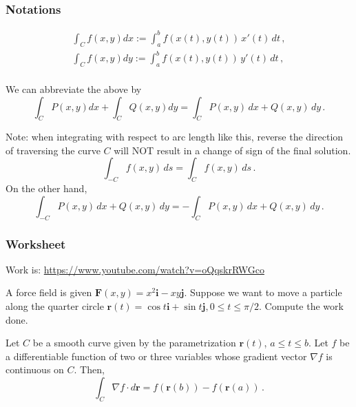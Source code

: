 \documentclass[aspectratio=169]{beamer}
\newcommand{\vect}{\mathbf}
\begin{document}
\begin{frame}
    \frametitle{Notations}
    \begin{align*}
    \int_C f(x,y) dx := \int_a^b f(x(t), y(t) ) \, x'(t) \, dt \,, \\
    \int_C f(x,y) dy := \int_a^b f(x(t), y(t) ) \, y'(t) \, dt \,, \\
    \end{align*}

    We can abbreviate the above by
    \begin{equation*}
    \int_C P(x,y) dx +
    \int_C Q(x,y) dy 
    = \int_C P(x,y) \, dx + Q(x,y) \, dy \,.
    \end{equation*}
\end{frame}

\begin{frame}
Note: when integrating with respect to arc length like this, reverse the direction of traversing the curve \(C\) will NOT result
in a change of sign of the final solution.
\begin{equation*}
    \int_{-C} f(x,y) \, ds =  \int_C f(x,y) \, ds \,.
\end{equation*}
On the other hand,
\begin{equation*}
\int_{-C} P(x,y) \, dx + Q(x,y) \, dy 
= -\int_C P(x,y) \, dx + Q(x,y) \, dy \,.
\end{equation*}
\end{frame}
\begin{frame}
    \frametitle{Worksheet}
    Work is: \url{https://www.youtube.com/watch?v=oQqskrRWGco}

    A force field is given $\vect{F}(x,y) = x^2 \vect{i} - xy \vect{j}$.
    Suppose we want to move a particle along the quarter circle
    $\vect{r}(t) = \cos t \vect{i} + \sin t \vect{j}, 0 \leq t \leq \pi/2$.
    Compute the work done.
\end{frame}


\begin{frame}
\begin{theorem}
Let \(C\) be a smooth curve given by the parametrization \(\mathbf{r}(t)\),
\(a \leq t \leq b\).
Let \(f\) be a differentiable function of two or three
variables whose gradient vector \(\nabla f\) is continuous on \(C\).
Then,
\begin{equation*}
    \int_C \nabla f \cdot d\mathbf{r} = f(\mathbf{r}(b)) - f(\mathbf{r}(a)) \,.
\end{equation*}
\end{theorem}
\end{frame}
\end{document}
